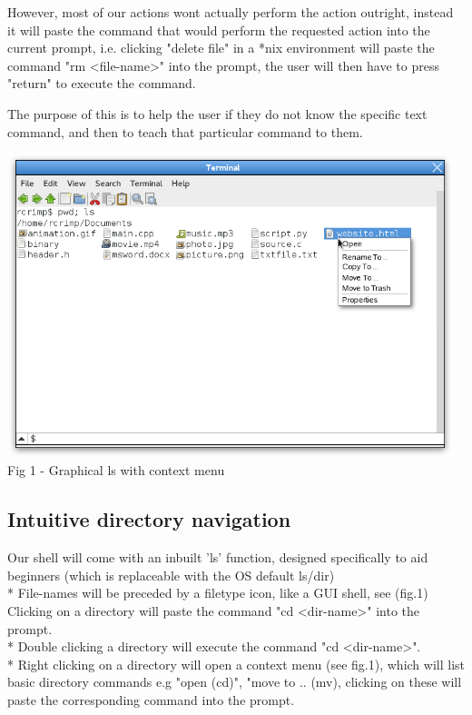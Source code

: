 \documentclass[a4paper,12pt]{article}
\begin{document}
However, most of our actions wont actually perform the action outright, instead it will paste the command that would perform the requested action into the current prompt, i.e. clicking "delete file" in a *nix environment will paste the command "rm \textless file-name\textgreater" into the prompt, the user will then have to press "return" to execute the command.

The purpose of this is to help the user if they do not know the specific text command, and then to teach that particular command to them.

\begin{center}
  \includegraphics[width=13cm]{context.png}\\
  \small Fig 1 - Graphical ls with context menu
\end{center}
\subsection*{Intuitive directory navigation}
Our shell will come with an inbuilt 'ls' function, designed specifically to aid beginners
(which is replaceable with the OS default ls/dir)\\*
File-names will be preceded by a filetype icon, like a GUI shell, see (fig.1)\\

Clicking on a directory will paste the command "cd \textless dir-name\textgreater" into the prompt.\\*
Double clicking a directory will execute the command "cd \textless dir-name\textgreater".\\*
Right clicking on a directory will open a context menu (see fig.1), which will list basic directory commands e.g "open (cd)", "move to .. (mv), clicking on these will paste the corresponding command into the prompt.
\end{document}
